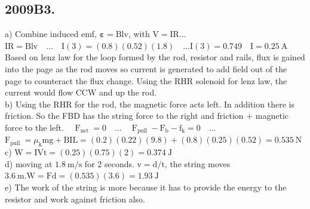 \begin{enumerate}
\section*{2009B3.}
a) Combine induced emf, $\boldsymbol{\varepsilon}=\mathrm{Blv}$, with $\mathrm{V}=\mathrm{IR} \ldots$\\
$\mathrm{IR}=\mathrm{Blv} \quad \ldots \quad \mathrm{I}(3)=(0.8)(0.52)(1.8) \quad \ldots \mathrm{I}(3)=0.749 \quad \mathrm{I}=0.25 \mathrm{~A}$\\
Based on lenz law for the loop formed by the rod, resistor and rails, flux is gained into the page as the rod moves so current is generated to add field out of the page to counteract the flux change. Using the RHR solenoid for lenz law, the current would flow CCW and up the rod.\\
b) Using the RHR for the rod, the magnetic force acts left. In addition there is friction. So the FBD has the string force to the right and friction + magnetic force to the left. $\quad \mathrm{F}_{\text {net }}=0 \quad \ldots \quad \mathrm{~F}_{\text {pull }}-\mathrm{F}_{\mathrm{b}}-\mathrm{f}_{\mathrm{k}}=0 \quad \ldots$\\
$\mathrm{F}_{\text {pull }}=\mu_{\mathrm{k}} \mathrm{mg}+\mathrm{BIL}=(0.2)(0.22)(9.8)+(0.8)(0.25)(0.52)=0.535 \mathrm{~N}$\\
c) $\mathrm{W}=\mathrm{IVt}=(0.25)(0.75)(2)=0.374 \mathrm{~J}$\\
d) moving at $1.8 \mathrm{~m} / \mathrm{s}$ for 2 seconds. $\mathrm{v}=\mathrm{d} / \mathrm{t}$, the string moves $3.6 \mathrm{~m} . \mathrm{W}=\mathrm{Fd}=(0.535)(3.6)=1.93 \mathrm{~J}$\\
e) The work of the string is more because it has to provide the energy to the resistor and work against friction also.


\end{enumerate}
